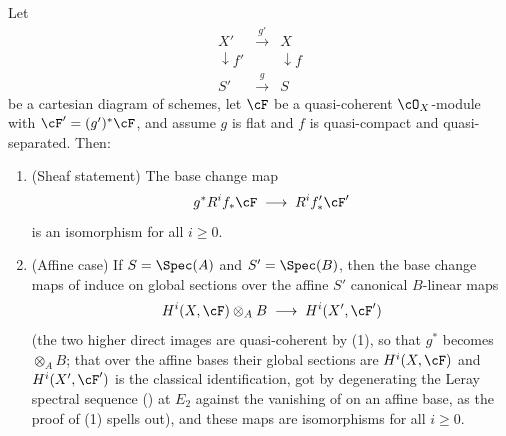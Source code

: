 \begin{lemma}
\label{lem:pc-flat-base-change-cohom}
Let
\[
\begin{array}{ccc}
X' & \xrightarrow{g'} & X\\[-2pt]
\downarrow{\scriptstyle f'} & & \downarrow{\scriptstyle f}\\[-2pt]
S' & \xrightarrow{g} & S
\end{array}
\]
be a cartesian diagram of schemes, let $\cF$ be a quasi-coherent
$\cO_X$-module with $\cF'=(g')^*\cF$, and assume $g$ is flat and $f$
is quasi-compact and quasi-separated.  Then:
\begin{enumerate}
\item (Sheaf statement) The base change map
\[
g^*R^if_*\cF\;\longrightarrow\;R^if'_*\cF'
\]
is an isomorphism for all $i\ge0$.
\item (Affine case) If $S=\Spec(A)$ and $S'=\Spec(B)$, then the base
change maps of  induce on global sections
over the affine $S'$ canonical $B$-linear maps
\[
H^i(X,\cF)\otimes_AB\;\longrightarrow\;H^i(X',\cF')
\]
(the two higher direct images are quasi-coherent by
(1), so that $g^*$ becomes $\otimes_AB$;
that over the affine bases their global sections are $H^i(X,\cF)$ and
$H^i(X',\cF')$ is the classical identification, got by degenerating the
Leray spectral sequence () at
$E_2$ against the vanishing of  on an
affine base, as the proof of (1) spells out), and these maps are
isomorphisms for all $i\ge0$.
\end{enumerate}
\end{lemma}
